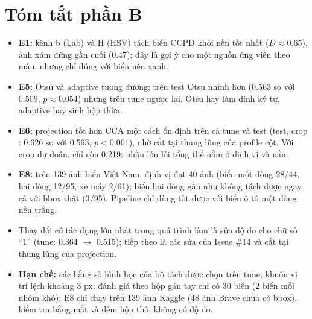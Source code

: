 \section{Tóm tắt phần B}

\begin{itemize}
  \item \textbf{E1:} kênh b (Lab) và H (HSV) tách biển CCPD khỏi nền tốt nhất ($D\approx 0.65$), ảnh xám đứng gần cuối ($0.47$); đây là gợi ý cho một nguồn ứng viên theo màu, nhưng chỉ đúng với biển nền xanh.
  \item \textbf{E5:} Otsu và adaptive tương đương; trên test Otsu nhỉnh hơn (0.563 so với 0.509, $p\approx 0.054$) nhưng trên tune ngược lại. Otsu hay làm dính ký tự, adaptive hay sinh hộp thừa.
  \item \textbf{E6:} projection tốt hơn CCA một cách ổn định trên cả tune và test (test, crop : 0.626 so với 0.563, $p<0.001$), nhờ cắt tại thung lũng của profile cột. Với crop dự đoán,  chỉ còn 0.219: phần lớn lỗi tổng thể nằm ở định vị và nắn.
  \item \textbf{E8:} trên 139 ảnh biển Việt Nam, định vị đạt 40 ảnh (biển một dòng 28/44, hai dòng 12/95, xe máy 2/61); biển hai dòng gần như không tách được ngay cả với bbox thật (3/95). Pipeline chỉ dùng tốt được với biển ô tô một dòng nền trắng.
  \item Thay đổi có tác dụng lớn nhất trong quá trình làm là sửa độ đo cho chữ số ``1'' (tune: 0.364 $\to$ 0.515); tiếp theo là các sửa của Issue \#14 và cắt tại thung lũng của projection.
  \item \textbf{Hạn chế:} các hằng số hình học của bộ tách được chọn trên tune; khuôn vị trí lệch khoảng 3 px; đánh giá theo hộp gán tay chỉ có 30 biển (2 biển mỗi nhóm khó); E8 chỉ chạy trên 139 ảnh Kaggle (48 ảnh Brave chưa có bbox), kiểm tra bằng mắt và đếm hộp thô, không có độ đo.
\end{itemize}
